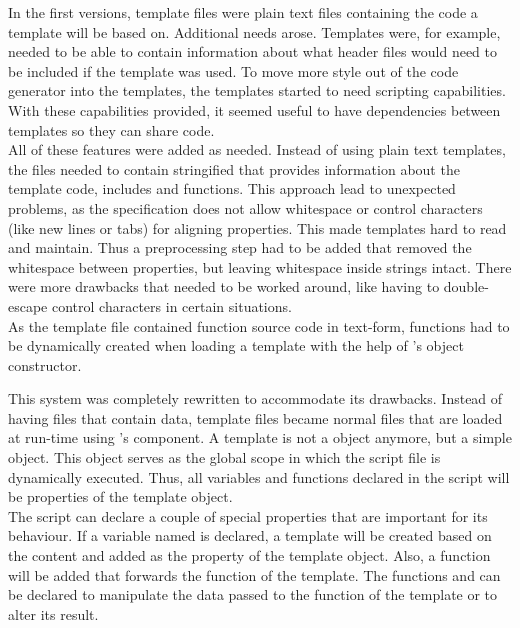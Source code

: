 In the first versions, template files were plain text files containing the code a  template will be based on. Additional needs arose. Templates were, for example, needed to be able to contain information about what  header files would need to be included if the template was used. To move more style out of the code generator into the templates, the templates started to need scripting capabilities. With these capabilities provided, it seemed useful to have dependencies between templates so they can share code.\\
All of these features were added as needed. Instead of using plain text templates, the files needed to contain stringified  that provides information about the template code, includes and functions. This approach lead to unexpected problems, as the  specification does not allow whitespace or control characters (like new lines or tabs) for aligning properties. This made templates hard to read and maintain. Thus a preprocessing step had to be added that removed the whitespace between properties, but leaving whitespace inside strings intact. There were more drawbacks that needed to be worked around, like having to double-escape control characters in certain situations.
\\As the template file contained function source code in text-form, functions had to be dynamically created when loading a template with the help of 's  object constructor.

This system was completely rewritten to accommodate its drawbacks. Instead of having files that contain  data, template files became normal  files that are loaded at run-time using 's  component. A template is not a  object anymore, but a simple  object. This object serves as the global scope in which the script file is dynamically executed. Thus, all variables and functions declared in the script will be properties of the template object.\\
The script can declare a couple of special properties that are important for its behaviour. If a variable named  is declared, a  template will be created based on the content and added as the  property of the template object. Also, a  function will be added that forwards the  function of the  template. The functions  and  can be declared to manipulate the data passed to the  function of the  template or to alter its result.

